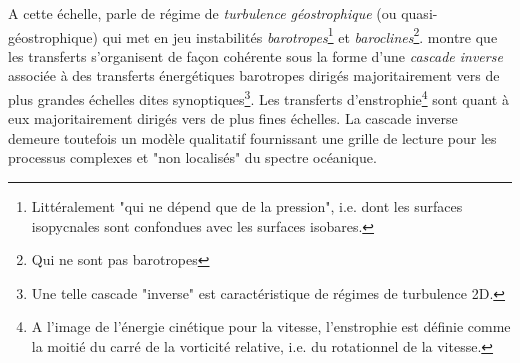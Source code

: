 A cette échelle, \citet{charney_geostrophic_1971} parle de régime de \textit{turbulence géostrophique} (ou quasi-géostrophique) qui met en jeu instabilités \textit{barotropes}\footnote{Littéralement "qui ne dépend que de la pression", i.e. dont les surfaces isopycnales sont confondues avec les surfaces isobares.} et \textit{baroclines}\footnote{Qui ne sont pas barotropes}. \cite{salmon_baroclinic_1980} montre que les transferts s'organisent de façon cohérente sous la forme d'une \textit{cascade inverse} associée à des transferts énergétiques barotropes dirigés majoritairement vers de plus grandes échelles dites synoptiques\footnote{Une telle cascade "inverse" est caractéristique de régimes de turbulence 2D.}. Les transferts d'enstrophie\footnote{A l'image de l'énergie cinétique pour la vitesse, l'enstrophie est définie comme la moitié du carré de la vorticité relative, i.e. du rotationnel de la vitesse.} sont quant à eux majoritairement dirigés vers de plus fines échelles. La cascade inverse demeure toutefois un modèle qualitatif fournissant une grille de lecture pour les processus complexes et "non localisés" du spectre océanique.




